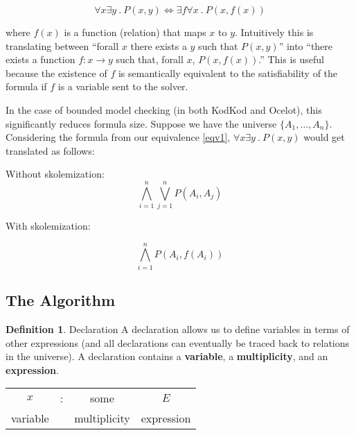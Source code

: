 \documentclass[10pt]{article}
\theoremstyle{definition}
\newtheorem{definition}{Definition}[section]
\begin{document}
  \begin{equation} \label{eqv1}
      \forall x \exists y~.~P(x, y) \Leftrightarrow \exists f \forall x~.~P(x, f(x))
  \end{equation}

  where $f(x)$ is a function (relation) that maps $x$ to $y$. Intuitively this is translating between ``forall $x$ there exists a $y$ such that $P(x, y)$'' into ``there exists a function $f : x \rightarrow y$ such that, forall $x$, $P(x, f(x))$.'' This is useful because the existence of $f$ is semantically equivalent to the satisfiability of the formula if $f$ is a variable sent to the solver.

  In the case of bounded model checking (in both KodKod and Ocelot), this significantly reduces formula size. Suppose we have the universe $\{A_1, \dots, A_n\}$. Considering the formula from our equivalence \ref{eqv1}, $\forall x \exists y~.~P(x,y)$ would get translated as follows:

  Without skolemization:
  \begin{equation} \label{woskolem}
      \bigwedge_{i=1}^n\bigvee_{j=1}^n P(A_i, A_j)
  \end{equation}

  With skolemization:

  \begin{equation} \label{wskolem}
      \bigwedge_{i=1}^nP(A_i, f(A_i))
  \end{equation}

  \subsection{The Algorithm}

  \theoremstyle{definition}
  \begin{definition}{Declaration}
      A declaration allows us to define variables in terms of other expressions (and all declarations can eventually be traced back to relations in the universe). A declaration contains a \textbf{variable}, a \textbf{multiplicity}, and an \textbf{expression}.

      \begin{center}
          \begin{tabular}{c c c c}
              $x$ & : & some & $E$ \\
              variable & & multiplicity & expression
          \end{tabular}
      \end{center}
  \end{definition}
\end{document}
